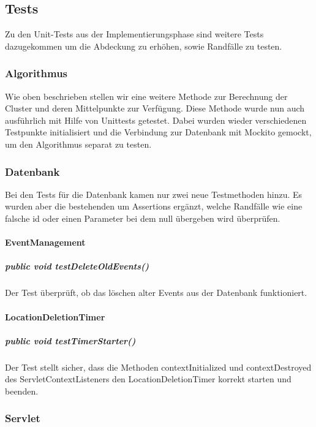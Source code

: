\documentclass{scrartcl}
\begin{document}
\subsection{Tests}
Zu den Unit-Tests aus der Implementierungsphase sind weitere Tests dazugekommen um die Abdeckung zu erhöhen, sowie Randfälle zu testen.
\subsubsection{Algorithmus}
Wie oben beschrieben stellen wir eine weitere Methode zur Berechnung der Cluster und deren Mittelpunkte zur Verfügung. Diese Methode wurde nun auch ausführlich mit Hilfe von Unittests getestet. Dabei wurden wieder verschiedenen Testpunkte initialisiert und die Verbindung zur Datenbank mit Mockito gemockt, um den Algorithmus separat zu testen.
\subsubsection{Datenbank}
Bei den Tests für die Datenbank kamen nur zwei neue Testmethoden hinzu.
Es wurden aber die bestehenden um Assertions ergänzt, welche Randfälle wie eine falsche id oder einen Parameter bei dem null übergeben wird überprüfen.
\paragraph{EventManagement}
\subparagraph{public void testDeleteOldEvents()}
Der Test überprüft, ob das löschen alter Events aus der Datenbank funktioniert.
\paragraph{LocationDeletionTimer}
\subparagraph{public void testTimerStarter()}
Der Test stellt sicher, dass die Methoden contextInitialized und contextDestroyed des ServletContextListeners den LocationDeletionTimer korrekt starten und beenden.
\newpage


\subsubsection{Servlet}
\end{document}
